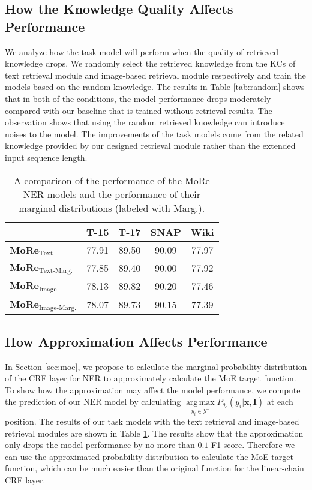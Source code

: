 \documentclass[11pt]{article}
\def\vx{{\bm{x}}}
\def\mI{{\bm{I}}}
\DeclareMathOperator*{\argmax}{arg\,max}
\begin{document}
\subsection{How the Knowledge Quality Affects Performance}
We analyze how the task model will perform when the quality of retrieved knowledge drops. We randomly select the retrieved knowledge from the KCs of text retrieval module and image-based retrieval module respectively and train the models based on the random knowledge. The results in Table \ref{tab:random} shows that in both of the conditions, the model performance drops moderately compared with our baseline that is trained without retrieval results. The observation shows that using the random retrieved knowledge can introduce noises to the model. The improvements of the task models come from the related knowledge provided by our designed retrieval module rather than the extended input sequence length.




\begin{table}[t!]
\small
\centering
\begin{tabular}{l|cccc}
\toprule
& T-15 & T-17 & SNAP  & Wiki\\
\midrule
\textbf{MoRe}$_{\text{Text}}$      & 77.91 & 89.50 & 90.09 & 77.97 \\
\textbf{MoRe}$_{\text{Text-Marg.}}$ & 77.85 & 89.40 & 90.00 & 77.92 \\
\textbf{MoRe}$_{\text{Image}}$       & 78.13 & 89.82 & 90.20 & 77.46 \\
\textbf{MoRe}$_{\text{Image-Marg.}}$  & 78.07 & 89.73 & 90.15 & 77.39 \\
\bottomrule
\end{tabular}
\caption{A comparison of the performance of the MoRe NER models and the performance of their marginal distributions (labeled with Marg.).}
\label{tab:marginal}
\end{table}

\subsection{How Approximation Affects Performance}
In Section \ref{sec:moe}, we propose to calculate the marginal probability distribution of the CRF layer for NER to approximately calculate the MoE target function. To show how the approximation may affect the model performance, we compute the prediction of our NER model by calculating $\argmax\limits_{y_i \in \mathcal{Y}^{\star}} P_{\theta_e}(y_i|\vx,\mI)$ at each position. The results of our task models with the text retrieval and image-based retrieval modules are shown in Table \ref{tab:marginal}. The results show that the approximation only drops the model performance by no more than $0.1$ F1 score. Therefore we can use the approximated probability distribution to calculate the MoE target function, which can be much easier than the original function for the linear-chain CRF layer.
\end{document}
